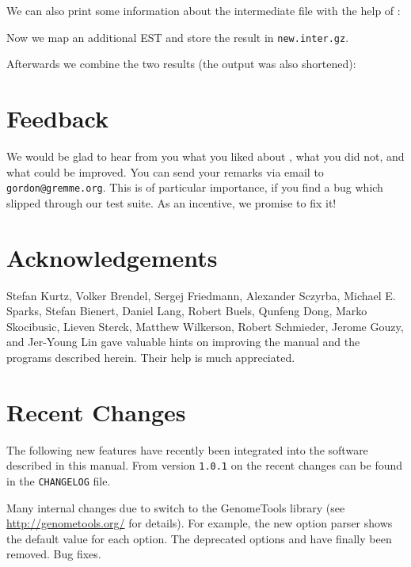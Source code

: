 \documentclass[11pt,a4paper,titlepage]{article}
\begin{document}

We can also print some information about the intermediate file with the help of
\Callgthfilestat:


Now we map an additional EST and store the result in \texttt{new.inter.gz}.


Afterwards we combine the two results (the output was also shortened):



\section{Feedback}
We would be glad to hear from you what you liked about \Gth, what you did not,
and what could be improved. You can send your remarks via email to
\texttt{gordon@gremme.org}. This is of particular importance, if you
find a bug which slipped through our test suite. As an incentive, we promise
to fix it!


\section{Acknowledgements}
Stefan Kurtz,
Volker Brendel,
Sergej Friedmann,
Alexander Sczyrba,
Michael E. Sparks,
Stefan Bienert,
Daniel Lang,
Robert Buels,
Qunfeng Dong,
Marko Skocibusic,
Lieven Sterck,
Matthew Wilkerson,
Robert Schmieder,
Jerome Gouzy,
and Jer-Young Lin
gave valuable hints on improving the manual and the
programs described herein. Their help is much appreciated.


\section{Recent Changes}
The following new features have recently been integrated into the
software described in this manual.
From version \texttt{1.0.1} on the recent changes can be found in the
\texttt{CHANGELOG} file.

Many internal changes due to switch to the GenomeTools library (see
\url{http://genometools.org/} for details). For example, the new option parser
shows the default value for each option.
The deprecated options  and 
have finally been removed. Bug fixes.
\end{document}
